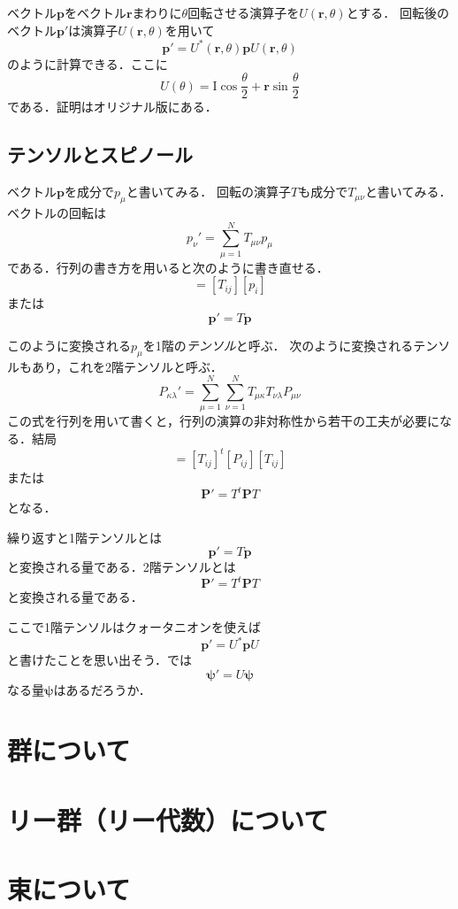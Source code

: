 \documentclass{jsbook}
\newcommand{\keyword}[1]{\emph{#1}}
\newcommand{\One}{\mathrm{I}}%
\newcommand{\bvec}[1]{\boldsymbol{#1}}
\begin{document}
ベクトル$\bvec{p}$をベクトル$\bvec{r}$まわりに$\theta$回転させる演算子を$U(\bvec{r},\theta)$とする．
回転後のベクトル$\bvec{p}'$は演算子$U(\bvec{r},\theta)$を用いて
\begin{equation}
\bvec{p}'=U^*(\bvec{r},\theta)\bvec{p}U(\bvec{r},\theta)
\end{equation}
のように計算できる．ここに
\begin{equation}
U(\theta)=\One\cos\frac{\theta}{2}+\bvec{r}\sin\frac{\theta}{2}
\end{equation}
である．証明はオリジナル版にある．

\section{テンソルとスピノール}

ベクトル$\bvec{p}$を成分で$p_\mu$と書いてみる．
回転の演算子$T$も成分で$T_{\mu\nu}$と書いてみる．
ベクトルの回転は
\begin{equation}
p_\nu'=\sum_{\mu=1}^NT_{\mu\nu}p_\mu
\end{equation}
である．行列の書き方を用いると次のように書き直せる．
\begin{equation}
[p_i']=[T_{ij}][p_i]
\end{equation}
または
\begin{equation}
\bvec{p}'=T\bvec{p}
\end{equation}

このように変換される$p_\mu$を1階の\keyword{テンソル}と呼ぶ．
次のように変換されるテンソルもあり，これを2階テンソルと呼ぶ．
\begin{equation}
P_{\kappa\lambda}'=\sum_{\mu=1}^N\sum_{\nu=1}^NT_{\mu\kappa}T_{\nu\lambda}P_{\mu\nu}
\end{equation}
この式を行列を用いて書くと，行列の演算の非対称性から若干の工夫が必要になる．結局
\begin{equation}
[P_{ij}']=[T_{ij}]^t[P_{ij}][T_{ij}]
\end{equation}
または
\begin{equation}
\bvec{P}'=T^t\bvec{P}T
\end{equation}
となる．

繰り返すと1階テンソルとは
\begin{equation}
\bvec{p}'=T\bvec{p}
\end{equation}
と変換される量である．2階テンソルとは
\begin{equation}
\bvec{P}'=T^t\bvec{P}T
\end{equation}
と変換される量である．

ここで1階テンソルはクォータニオンを使えば
\begin{equation}
\bvec{p}'=U^*\bvec{p}U
\end{equation}
と書けたことを思い出そう．では
\begin{equation}
\bvec{\psi}'=U\bvec{\psi}
\end{equation}
なる量$\bvec{\psi}$はあるだろうか．


\chapter{群について}

\chapter{リー群（リー代数）について}

\chapter{束について}
\end{document}
